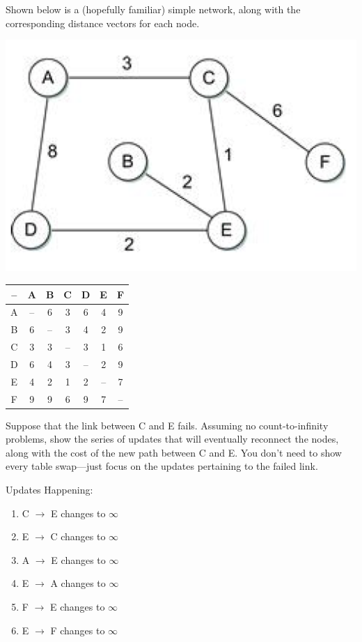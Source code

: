 \documentclass[12pt,addpoints,answers]{exam}
\begin{document}
\begin{questions}
\question[15] Shown below is a (hopefully familiar) simple network, along with the corresponding distance vectors for each node.
\begin{center}
\begin{minipage}{0.45\linewidth}\includegraphics[width=0.9\linewidth]{fig/distance.png}\end{minipage}
\begin{minipage}{0.45\linewidth}
\begin{tabular}{c|cccccc}
\toprule
-- & A        & B        & C        & D        & E        & F        \\
\midrule
A  & --       & 6        & 3        & 6        & 4        & 9        \\
B  & 6        & --       & 3        & 4        & 2        & 9        \\
C  & 3        & 3        & --       & 3        & 1        & 6        \\
D  & 6        & 4        & 3        & --       & 2        & 9        \\
E  & 4        & 2        & 1        & 2        & --       & 7        \\
F  & 9        & 9        & 6        & 9        & 7        & --       \\
\bottomrule
\end{tabular}
\end{minipage}
\end{center}
Suppose that the link between C and E fails. Assuming no count-to-infinity problems, show the series of updates that will eventually reconnect the nodes, along with the cost of the new path between C and E. You don't need to show every table swap---just focus on the updates pertaining to the failed link.
\begin{solution}[5in]
	Updates Happening:
	\begin{enumerate}
		\item C $\rightarrow$ E changes to $\infty$
		\item E $\rightarrow$ C changes to $\infty$
		\item A $\rightarrow$ E changes to $\infty$
		\item E $\rightarrow$ A changes to $\infty$
		\item F $\rightarrow$ E changes to $\infty$
		\item E $\rightarrow$ F changes to $\infty$
		

\end{enumerate}
\end{solution}
\end{questions}
\end{document}
